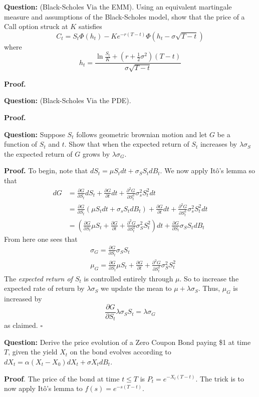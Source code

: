 \documentclass{article}
\begin{document}
\begin{tcolorbox}[colframe=black,colback=gray!5,boxrule=0.5pt]
\textbf{Question:} (Black-Scholes Via the EMM). Using an equivalent martingale measure and assumptions of the Black-Scholes model, show that the price of a Call option struck at $K$ satisfies
$$C_t = S_t\Phi(h_t) - Ke^{-r(T-t)}\Phi(h_t-\sigma\sqrt{T-t})$$
where 
$$h_t = \frac{\ln\frac{S_t}{K} + (r+\frac{1}{2}\sigma^2)(T-t)}{\sigma\sqrt{T-t}}$$
\end{tcolorbox}
\textbf{Proof.}

\begin{tcolorbox}[colframe=black,colback=gray!5,boxrule=0.5pt]
\textbf{Question:} (Black-Scholes Via the PDE). 
\end{tcolorbox}
\textbf{Proof.}


\begin{tcolorbox}[colframe=black,colback=gray!5,boxrule=0.5pt]
\textbf{Question:} Suppose $S_t$ follows geometric brownian motion and let $G$ be a function of $S_t$ and $t$. Show that when the expected return of $S_t$ increases by $\lambda \sigma _S$ the expected return of $G$ grows by $\lambda \sigma _G$. \cite{Hull}
\end{tcolorbox}
\textbf{Proof.} To begin, note that $dS_t = \mu S_t dt + \sigma_S S_tdB_t$. We now apply Itô's lemma so that 
\begin{align*}
   dG &= \frac{\partial G}{\partial S_t}dS_t + \frac{\partial G}{\partial t}dt + \frac{\partial^2 G}{\partial S_t^2}\sigma^2_s S_t^2dt  \\
   &= \frac{\partial G}{\partial S_t}(\mu S_t dt + \sigma_sS_tdB_t) + \frac{\partial G}{\partial t}dt + \frac{\partial^2 G}{\partial S_t^2}\sigma^2_s S_t^2dt \\
   &= \left(\frac{\partial G}{\partial S_t}\mu S_t + \frac{\partial G}{\partial t} + \frac{\partial^2 G}{\partial S_t^2}\sigma_S^2S_t^2\right)dt + \frac{\partial G}{\partial S_t}\sigma_S S_t dB_t
\end{align*}
From here one sees that 
\begin{align*}
     & \sigma_G = \frac{\partial G}{\partial S_t}\sigma_S S_t \\
    & \mu_G  = \frac{\partial G}{\partial S_t}\mu S_t + \frac{\partial G}{\partial t} + \frac{\partial^2 G}{\partial S_t^2}\sigma_S^2S_t^2
\end{align*}
The \textit{expected return of $S_t$} is controlled entirely through $\mu$. So to increase the expected rate of return by $\lambda\sigma_S$ we update the mean to $\mu + \lambda\sigma_S$. Thus, $\mu_G$ is increased by
$$\frac{\partial G}{\partial S_t}\lambda\sigma_S S_t = \lambda\sigma_G$$
as claimed. $\square$
 
\begin{tcolorbox}[colframe=black,colback=gray!5,boxrule=0.5pt]
\textbf{Question:} Derive the price evolution of a Zero Coupon Bond paying \$1 at time $T$, given the yield $X_t$ on the bond evolves according to $dX_t = \alpha(X_t-X_0)dX_t + \sigma X_tdB_t$. \cite{Hull}
\end{tcolorbox}
\textbf{Proof}. The price of the bond at time $t\leq T$ is $P_t = e^{-X_t(T-t)}$. The trick is to now apply Itô's lemma to $f(s) = e^{-s(T-t)}$.
\newpage
 
\end{document}
